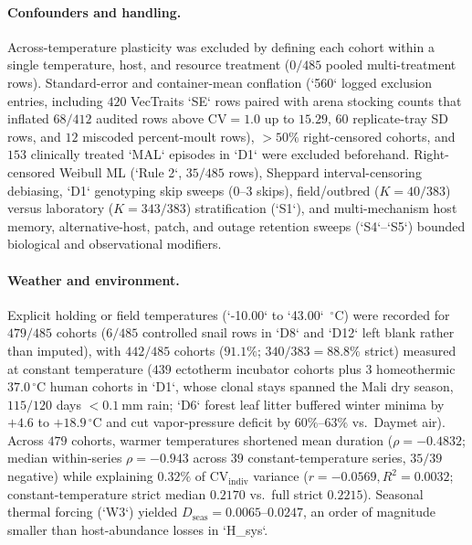 \paragraph{Confounders and handling.}
Across-temperature plasticity was excluded by defining each cohort within a single temperature, host, and resource treatment ($0/485$ pooled multi-treatment rows). Standard-error and container-mean conflation (`560` logged exclusion entries, including $420$ VecTraits `SE` rows paired with arena stocking counts that inflated $68/412$ audited rows above $\mathrm{CV} = 1.0$ up to $15.29$, $60$ replicate-tray SD rows, and $12$ miscoded percent-moult rows), $> 50\%$ right-censored cohorts, and $153$ clinically treated `MAL` episodes in `D1` were excluded beforehand. Right-censored Weibull ML (`Rule 2`, $35/485$ rows), Sheppard interval-censoring debiasing, `D1` genotyping skip sweeps ($0$--$3$ skips), field/outbred ($K = 40/383$) versus laboratory ($K = 343/383$) stratification (`S1`), and multi-mechanism host memory, alternative-host, patch, and outage retention sweeps (`S4`--`S5`) bounded biological and observational modifiers.

\paragraph{Weather and environment.}
Explicit holding or field temperatures (`-10.00` to `43.00`~$^{\circ}\mathrm{C}$) were recorded for $479/485$ cohorts ($6/485$ controlled snail rows in `D8` and `D12` left blank rather than imputed), with $442/485$ cohorts ($91.1\%$; $340/383 = 88.8\%$ strict) measured at constant temperature ($439$ ectotherm incubator cohorts plus $3$ homeothermic $37.0\,^{\circ}\mathrm{C}$ human cohorts in `D1`, whose clonal stays spanned the Mali dry season, $115/120$ days $< 0.1\ \mathrm{mm}$ rain; `D6` forest leaf litter buffered winter minima by $+4.6$ to $+18.9\,^{\circ}\mathrm{C}$ and cut vapor-pressure deficit by $60\%$--$63\%$ vs.\ Daymet air). Across $479$ cohorts, warmer temperatures shortened mean duration ($\rho = -0.4832$; median within-series $\rho = -0.943$ across $39$ constant-temperature series, $35/39$ negative) while explaining $0.32\%$ of $\mathrm{CV}_{\mathrm{indiv}}$ variance ($r = -0.0569, R^2 = 0.0032$; constant-temperature strict median $0.2170$ vs.\ full strict $0.2215$). Seasonal thermal forcing (`W3`) yielded $D_{\mathrm{seas}} = 0.0065$--$0.0247$, an order of magnitude smaller than host-abundance losses in `H\_sys`.

